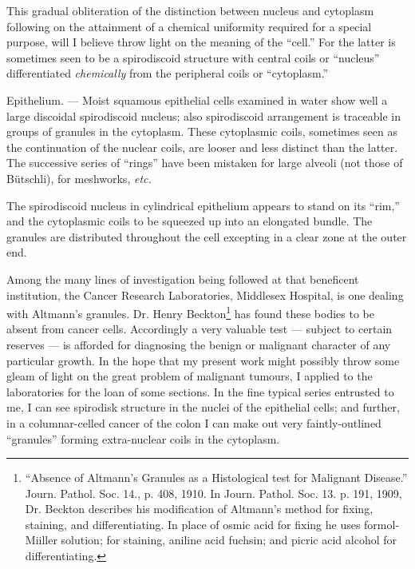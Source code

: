 \documentclass[a4paper, 12pt, oneside, landscape]{article}
\begin{document}
This gradual obliteration of the distinction between nucleus and cytoplasm following on the attainment of a chemical uniformity required for a special purpose, will I believe throw light on the meaning of the ``cell.'' For the latter is sometimes seen to be a spirodiscoid structure with central coils or ``nucleus'' differentiated \emph{chemically} from the peripheral coils or ``cytoplasm.''

Epithelium. --- Moist squamous epithelial cells examined in water show well a large discoidal spirodiscoid nucleus; also spirodiscoid arrangement is traceable in groups of granules in the cytoplasm. These cytoplasmic coils, sometimes seen as the continuation of the nuclear coils, are looser and less distinct than the latter. The successive series of ``rings'' have been mistaken for large alveoli (not those of Bütschli), for meshworks, \emph{etc.}

The spirodiscoid nucleus in cylindrical epithelium appears to stand on its ``rim,'' and the cytoplasmic coils to be squeezed up into an elongated bundle. The granules are distributed throughout the cell excepting in a clear zone at the outer end.

Among the many lines of investigation being followed at that beneficent institution, the Cancer Research Laboratories, Middlesex Hospital, is one dealing with Altmann's granules. Dr. Henry Beckton\footnote{``Absence of Altmann's Granules as a Histological test for Malignant Disease.'' Journ. Pathol. Soc. 14., p. 408, 1910. In Journ. Pathol. Soc. 13. p. 191, 1909, Dr. Beckton describes his modification of Altmann's method for fixing, staining, and differentiating. In place of osmic acid for fixing he uses formol-Miiller solution; for staining, aniline acid fuchsin; and picric acid alcohol for differentiating.} has found these bodies to be absent from cancer cells. Accordingly a very valuable test --- subject to certain reserves --- is afforded for diagnosing the benign or malignant character of any particular growth. In the hope that my present work might possibly throw some gleam of light on the great problem of malignant tumours, I applied to the laboratories for the loan of some sections. In the fine typical series entrusted to me, I can see spirodisk structure in the nuclei of the epithelial cells; and further, in a columnar-celled cancer of the colon I can make out very faintly-outlined ``granules'' forming extra-nuclear coils in the cytoplasm.
\end{document}
